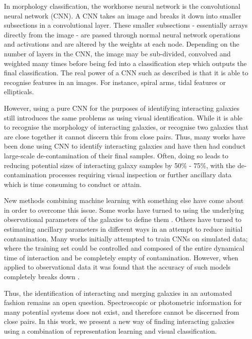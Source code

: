 In morphology classification, the workhorse neural network is the convolutional neural network (CNN). A CNN takes an image and breaks it down into smaller subsections in a convolutional layer. These smaller subsections - essentially arrays directly from the image - are passed through normal neural network operations and activations and are altered by the weights at each node. Depending on the number of layers in the CNN, the image may be sub-divided, convolved and weighted many times before being fed into a classification step which outputs the final classification. The real power of a CNN such as described is that it is able to recognise features in an images. For instance, spiral arms, tidal features or ellipticals. 

However, using a pure CNN for the purposes of identifying interacting galaxies still introduces the same problems as using visual identification. While it is able to recognise the morphology of interacting galaxies, or recognise two galaxies that are close together it cannot discern this from close pairs. Thus, many works have been done using CNN to identify interacting galaxies and have then had conduct large-scale de-contamination of their final samples. Often, doing so leads to reducing potential sizes of interacting galaxy samples by 50\% - 75\%, with the de-contamination processes requiring visual inspection or further ancillary data which is time consuming to conduct or attain.

New methods combining machine learning with something else have come about in order to overcome this issue. Some works have turned to using the underlying observational parameters of the galaxies to define them \citep{2023ApJ...958...96R}. Others have turned to estimating ancillary parameters in different ways in an attempt to reduce initial contamination. Many works initially attempted to train CNNs on simulated data; where the training set could be controlled and composed of the entire dynamical time of interaction and be completely empty of contamination. However, when applied to observational data it was found that the accuracy of such models completely breaks down \citep{2019MNRAS.490.5390B, 2020A&C....3200390C}.

Thus, the identification of interacting and merging galaxies in an automated fashion remains an open question. Spectroscopic or photometric information for many potential systems does not exist, and therefore cannot be discerned from close pairs. In this work, we present a new way of finding interacting galaxies using a combination of representation learning \citep{2022MNRAS.513.1581W} and visual classification.

